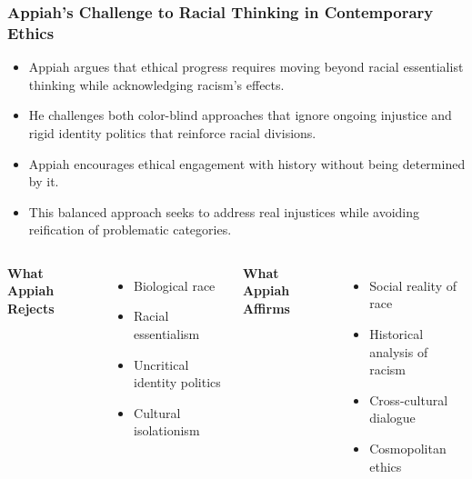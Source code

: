 \documentclass{beamer}
\begin{document}
	\begin{frame}
		\frametitle{Appiah's Challenge to Racial Thinking in Contemporary Ethics}
		
		\begin{itemize}
			\item Appiah argues that ethical progress requires moving beyond racial essentialist thinking while acknowledging racism's effects.
			\item He challenges both color-blind approaches that ignore ongoing injustice and rigid identity politics that reinforce racial divisions.
			\item Appiah encourages ethical engagement with history without being determined by it.
			\item This balanced approach seeks to address real injustices while avoiding reification of problematic categories.
		\end{itemize}
		
		\begin{columns}
			\textbf{What Appiah Rejects}
			\begin{itemize}
				\item Biological race
				\item Racial essentialism
				\item Uncritical identity politics
				\item Cultural isolationism
			\end{itemize}
			
			\textbf{What Appiah Affirms}
			\begin{itemize}
				\item Social reality of race
				\item Historical analysis of racism
				\item Cross-cultural dialogue
				\item Cosmopolitan ethics
			\end{itemize}
		\end{columns}
		
	\end{frame}
	
\end{document}
